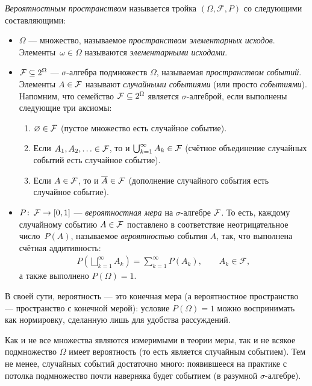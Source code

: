 \documentclass[../main.tex]{subfiles}
\begin{document}
\begin{df}
 \textit{Вероятностным пространством} называется тройка $(\Omega, \mathcal F, P)$ со следующими составляющими:
 \begin{itemize}
  \item $\Omega$ --- множество, называемое \textit{пространством элементарных исходов}. Элементы~$ \omega \in \Omega $ называются \textit{элементарными исходами}.
  \item $\mathcal F \subseteq 2^{\Omega}$ --- $\sigma$-алгебра подмножеств $\Omega$, называемая \textit{пространством событий}. Элементы $A \in \mathcal F$ называют \textit{случайными событиями} (или просто \textit{событиями}). Напомним, что семейство $ \mathcal F \subseteq 2^{\Omega} $ является $ \sigma $-алгеброй, если выполнены следующие три аксиомы:
   \begin{enumerate}
    \item $ \varnothing \in \mathcal F $ (пустое множество есть случайное событие).
    \item Если $ A_1, A_2, \ldots \in \mathcal F $, то и $\bigcup_{k=1}^{\infty}A_k \in \mathcal F$ (счётное объединение случайных событий есть случайное событие).
    \item Если $ A \in \mathcal F $, то и $ \overline A \in \mathcal F $ (дополнение случайного события есть случайное событие).
   \end{enumerate}
  \item $P \colon\, \mathcal F \to [0,1]$ --- \textit{вероятностная мера} на $ \sigma $-алгебре $\mathcal F$. То есть, каждому случайному событию $ A \in \mathcal F $ поставлено в соответствие неотрицательное число~$ P(A) $\nopagebreak, называемое \textit{вероятностью} события $ A $, так, что выполнена счётная аддитивность:
   \begin{align*}
    P \left( \bigsqcup_{k=1}^{\infty}A_k \right) = \sum_{k=1}^{\infty}P(A_k), \qquad A_k \in \mathcal F,
   \end{align*} а также выполнено $P(\Omega) = 1$.
 \end{itemize}
\end{df}
В своей сути, вероятность --- это конечная мера (а вероятностное пространство --- пространство с конечной мерой): условие $ P(\Omega) = 1 $ можно воспринимать как нормировку, сделанную лишь для удобства рассуждений.

Как и не все множества являются измеримыми в теории меры, так и не всякое подмножество $ \Omega $ имеет вероятность (то есть является случайным событием). Тем не менее, случайных событий достаточно много: появившееся на практике с потолка подмножество почти наверняка будет событием (в разумной $ \sigma $-алгебре).
\end{document}
